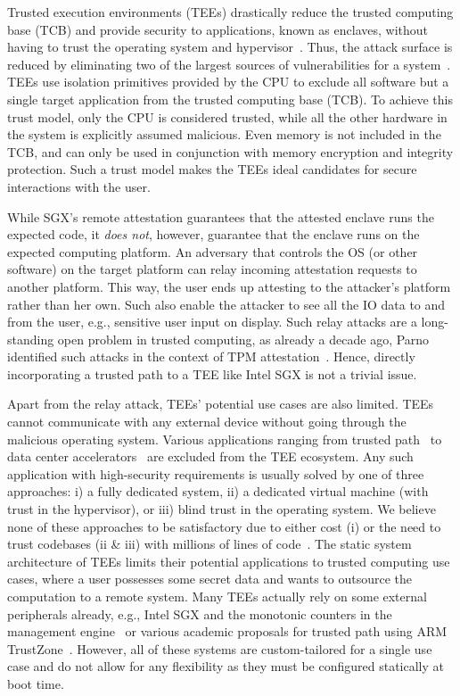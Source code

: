 Trusted execution environments (TEEs) drastically reduce the trusted computing base (TCB) and provide security to applications, known as enclaves, without having to trust the operating system and hypervisor~\cite{costan2016intel,winter2008trusted,costan2016sanctum}. Thus, the attack surface is reduced by eliminating two of the largest sources of vulnerabilities for a system~\cite{checkoway2013iago,suzaki2011memory}. TEEs use isolation primitives provided by the CPU to exclude all software but a single target application from the trusted computing base (TCB). To achieve this trust model, only the CPU is considered trusted, while all the other hardware in the system is explicitly assumed malicious. Even memory is not included in the TCB, and can only be used in conjunction with memory encryption and integrity protection. Such a trust model makes the TEEs ideal candidates for secure interactions with the user. 


While SGX's remote attestation guarantees that the attested enclave runs the expected code, it \emph{does not}, however,  guarantee that the enclave runs on the expected computing platform. An adversary that controls the OS (or other software) on the target platform can relay incoming attestation requests to another platform. This way, the user ends up attesting to the attacker's platform rather than her own. Such also enable the attacker to see all the IO data to and from the user, e.g., sensitive user input on display. Such relay attacks are a long-standing open problem in trusted computing, as already a decade ago, Parno identified such attacks in the context of TPM attestation~\cite{parno2008bootstrapping}. Hence, directly incorporating a trusted path to a TEE like Intel SGX is not a trivial issue.



Apart from the relay attack, TEEs' potential use cases are also limited.  TEEs cannot communicate with any external device without going through the malicious operating system. Various applications ranging from trusted path~\cite{zhou2012building,Fidelius,protection} to data center accelerators~\cite{volos2018graviton} are excluded from the TEE ecosystem. Any such application with high-security requirements is usually solved by one of three approaches: i) a fully dedicated system, ii) a dedicated virtual machine (with trust in the hypervisor), or iii) blind trust in the operating system. We believe none of these approaches to be satisfactory due to either cost (i) or the need to trust codebases (ii \& iii) with millions of lines of code~\cite{torvalds2020linux,barham2003xen}.
The static system architecture of TEEs limits their potential applications to trusted computing use cases, where a user possesses some secret data and wants to outsource the computation to a remote system. Many TEEs actually rely on some external peripherals already, e.g., Intel SGX and the monotonic counters in the management engine~\cite{matetic2017rote} or various academic proposals for trusted path using ARM TrustZone~\cite{SeCloak,VButton}. However, all of these systems are custom-tailored for a single use case and do not allow for any flexibility as they must be configured statically at boot time.


